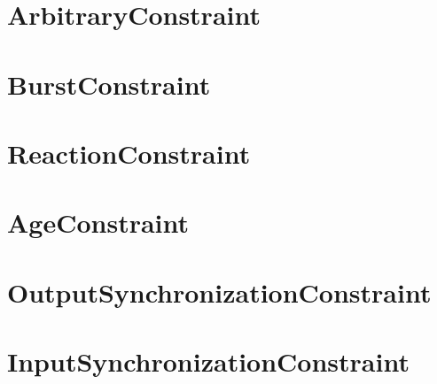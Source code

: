 \section{ArbitraryConstraint}
\section{BurstConstraint}
\section{ReactionConstraint}
\section{AgeConstraint}
\section{OutputSynchronizationConstraint}
\section{InputSynchronizationConstraint}